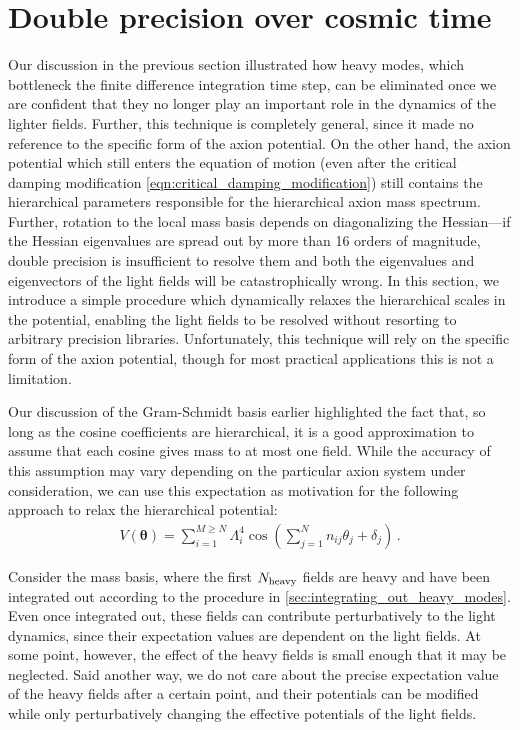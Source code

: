 \documentclass[11pt]{article}
\begin{document}
\section{Double precision over cosmic time}\label{sec:double_precision_over_cosmic_time}
Our discussion in the previous section illustrated how heavy modes, which bottleneck the finite difference integration time step, can be eliminated once we are confident that they no longer play an important role in the dynamics of the lighter fields. Further, this technique is completely general, since it made no reference to the specific form of the axion potential. On the other hand, the axion potential which still enters the equation of motion (even after the critical damping modification \cref{eqn:critical_damping_modification}) still contains the hierarchical parameters responsible for the hierarchical axion mass spectrum. Further, rotation to the local mass basis depends on diagonalizing the Hessian---if the Hessian eigenvalues are spread out by more than 16 orders of magnitude, double precision is insufficient to resolve them and both the eigenvalues and eigenvectors of the light fields will be catastrophically wrong. In this section, we introduce a simple procedure which dynamically relaxes the hierarchical scales in the potential, enabling the light fields to be resolved without resorting to arbitrary precision libraries. Unfortunately, this technique will rely on the specific form of the axion potential, though for most practical applications this is not a limitation.

Our discussion of the Gram-Schmidt basis earlier highlighted the fact that, so long as the cosine coefficients are hierarchical, it is a good approximation to assume that each cosine gives mass to at most one field. While the accuracy of this assumption may vary depending on the particular axion system under consideration, we can use this expectation as motivation for the following approach to relax the hierarchical potential:
\begin{align}
    V({\bm\theta}) = \sum_{i = 1}^{M\geq N}\Lambda_i^4\cos\left(\sum_{j = 1}^N n_{ij}\theta_j + \delta_j\right)\,.
\end{align}

Consider the mass basis, where the first $N_{\rm heavy}$ fields are heavy and have been integrated out according to the procedure in \cref{sec:integrating_out_heavy_modes}. Even once integrated out, these fields can contribute perturbatively to the light dynamics, since their expectation values are dependent on the light fields. At some point, however, the effect of the heavy fields is small enough that it may be neglected. Said another way, we do not care about the precise expectation value of the heavy fields after a certain point, and their potentials can be modified while only perturbatively changing the effective potentials of the light fields.
\end{document}
